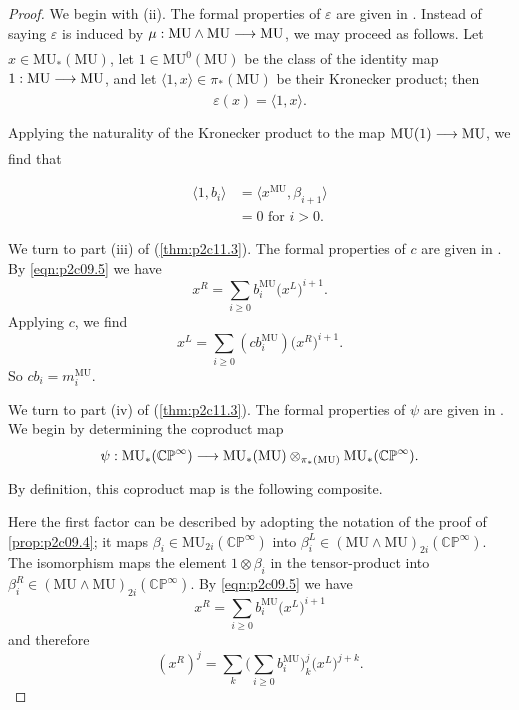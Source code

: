 \documentclass[../main]{subfiles}
\begin{document}
\begin{proof}
We begin with (ii). The formal properties of $\varepsilon$ are given in \cite{adams3}. Instead of saying $\varepsilon$ is induced by $\mu : \mathrm{MU} \wedge \mathrm{MU} \lar{} \mathrm{MU}$, we may proceed as follows. Let $x \in \mathrm{MU}_\ast(\mathrm{MU})$, let $1 \in \mathrm{MU}^0(\mathrm{MU})$ be the class of the identity map $1 : \mathrm{MU} \lar{} \mathrm{MU}$, and let $\langle 1, x\rangle \in \pi_\ast(\mathrm{MU})$ be their Kronecker product; then \[\varepsilon(x) = \langle 1, x\rangle.\]

Applying the naturality of the Kronecker product to the map $\mathrm{MU}(1) \lar{} \mathrm{MU}$, we find that

\begin{align*}
\langle 1, b_i\rangle & = \big\langle x^{\mathrm{MU}}, \beta_{i + 1}\big\rangle \\ & = 0 \text { for } i > 0.
\end{align*}

We turn to part (iii) of (\ref{thm:p2c11.3}). The formal properties of $c$ are given in \cite{adams3}. By \eqref{eqn:p2c09.5} we have \[x^R = \sum_{i \ge 0} b_i^{\mathrm{MU}} \big(x^L\big)^{i + 1}.\] Applying $c$, we find \[x^L = \sum_{i \ge 0} (c b_i^{\mathrm{MU}}) \big(x^R\big)^{i + 1}.\] So $c b_i = m_i^{\mathrm{MU}}$.

We turn to part (iv) of (\ref{thm:p2c11.3}). The formal properties of $\psi$ are given in \cite{adams3}. We begin by determining the coproduct map \[\psi : \mathrm{MU}_\ast(\mathbb {CP}^\infty) \lar{} \mathrm{MU}_\ast(\mathrm{MU}) \otimes_{\pi_\ast(\mathrm{MU})} \mathrm{MU}_\ast(\mathbb {CP}^\infty).\] By definition, this coproduct map is the following composite.

\begin{center}
\end{center}

Here the first factor can be described by adopting the notation of the proof of \eqref{prop:p2c09.4}; it maps $\beta_i \in \mathrm{MU}_{2i} (\mathbb {CP}^\infty)$ into $\beta_i^L \in (\mathrm{MU} \wedge \mathrm{MU})_{2i}(\mathbb {CP}^\infty)$. The isomorphism maps the element $1 \otimes \beta_i$ in the tensor-product into $\beta_i^R \in (\mathrm{MU} \wedge \mathrm{MU})_{2i}(\mathbb {CP}^\infty)$. By \eqref{eqn:p2c09.5} we have \[x^R = \sum_{i \ge 0} b_i^{\mathrm{MU}} \big(x^L\big)^{i + 1}\] and therefore \[(x^R)^j = \sum_k \bigg(\sum_{i \ge 0} b_i^{\mathrm{MU}}\bigg)_k^j \big(x^L\big)^{j + k}.\]


\end{proof}
\end{document}
